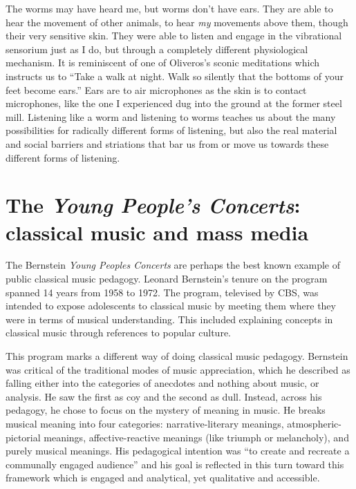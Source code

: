 \documentclass[12pt,letterpaper]{article}
\begin{document}
	The worms may have heard me, but worms don't have ears. They are able 
	to hear the movement of other 
	animals, to hear \textit{my} movements above them, though their very
	sensitive skin. They were able to listen and engage in the vibrational
	sensorium just as I do, but through a completely different physiological
	mechanism. It is reminiscent of one of Oliveros's sconic meditations 
	which instructs us to ``Take a walk at night. Walk so silently that the
	bottoms of your feet become ears.''\autocite{Oliveros} Ears are to air
	microphones as the skin is to contact microphones, like the one I 
	experienced dug into the ground at the former steel mill. Listening
	like a worm and listening to worms teaches us about the many 
	possibilities for radically different forms of listening, but also the
	real material and social barriers and striations that bar us from or 
	move us towards these different forms of listening.
		
	\section*{The \textit{Young People's Concerts}: classical music and 
	mass media}

	\noindent The Bernstein \textit{Young Peoples Concerts} are perhaps the
	best known example of public classical music pedagogy. Leonard 
	Bernstein's tenure
	on the program spanned 14 years from 1958 to 1972. The program, televised by
	CBS, was intended to expose adolescents to classical music by meeting 
	them where they were in terms of musical understanding. This included  
	explaining concepts in classical music through references to popular 
	culture.    

	This program marks a different way of doing classical 
	music
	pedagogy. Bernstein was critical of the traditional modes of music 
	appreciation, which he described as falling either into the categories 
	of anecdotes and nothing about music, or analysis. He saw the first as 
	coy and
	the second as dull. Instead, across his pedagogy, he chose to focus on 
	the mystery of meaning in music. He breaks musical meaning into four 
	categories: narrative-literary meanings, atmospheric-pictorial meanings,
	affective-reactive meanings (like triumph or melancholy), and purely 
	musical meanings.\autocite[14]{Kopfstein}  His pedagogical intention 
	was ``to create and recreate a communally engaged 
	audience''\autocite[51]{Kopfstein} and his goal is reflected in this
	turn toward this framework which is engaged and analytical, yet 
	qualitative and accessible.  
 	
\end{document}
